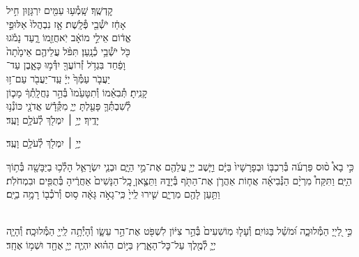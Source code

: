 \documentclass[twoside, openany, parskip=half, 11pt]{book}
\begin{document}
קׇדְשֶֽׁךָ׃ \hfill שָֽׁמְ֯ע֥וּ עַמִּ֖ים יִרְגָּז֑וּן \hfill חִ֣יל \\
אָחַ֔ז יֹשְׁ֯בֵ֖י פְּ֯לָֽשֶׁת׃ \hfill אָ֤ז נִבְהֲלוּ֙ אַלּוּפֵ֣י \\
אֱד֔וֹם \hfill אֵילֵ֣י מוֹאָ֔ב יֹֽאחֲזֵ֖מוֹ רָ֑עַד \hfill נָמֹ֕גוּ \\
כֹּ֖ל יֹשְׁ֯בֵ֥י כְ֯נָֽעַן׃ \hfill תִּפֹּ֨ל עֲלֵיהֶ֤ם אֵימָ֙תָה֙ \\
וָפַ֔חַד \hfill בִּגְדֹ֥ל זְ֯רוֹעֲךָ֖ יִדְּ֯מ֣וּ כָּאָ֑בֶן \hfill עַד־\\
יַעֲבֹ֤ר עַמְּ֯ךָ֙ יְיָ֔ \hfill עַֽד־יַעֲבֹ֖ר עַם־ז֥וּ \\
קָנִֽיתָ׃ \hfill תְּ֯בִאֵ֗מוֹ וְ֯תִטָּעֵ֙מוֹ֙ בְּ֯הַ֣ר נַחֲלָֽתְ֯ךָ֔ \hfill מָכ֧וֹן \\
לְ֯שִׁבְתְּ֯ךָ֛ פָּעַ֖לְתָּ יְיָ֑ \hfill מִקְּ֯דָ֕שׁ אֲדֹנָ֖י כּוֹנְ֯נ֥וּ \\
יָדֶֽיךָ׃ \hfill יְיָ֥ ׀ יִמְלֹ֖ךְ לְ֯עֹלָ֥ם וָעֶֽד׃\hfill \break
\begin{small}
יְיָ֥ ׀ יִמְלֹ֖ךְ לְ֯עֹלָ֥ם וָעֶֽד׃\\
\end{small}
\begin{small}
כִּ֣י בָא֩ ס֨וּס פַּרְעֹ֜ה בְּ֯רִכְבּ֤וֹ וּבְפָרָשָׁיו֙ בַּיָּ֔ם וַיָּ֧שֶׁב יְיָ֛ עֲלֵהֶ֖ם אֶת־מֵ֣י הַיָּ֑ם וּבְנֵ֧י יִשְׂרָאֵ֛ל הָלְ֯כ֥וּ בַיַּבָּשָׁ֖ה בְּ֯ת֥וֹךְ הַיָּֽם׃ וַתִּקַּח֩ מִרְיָ֨ם הַנְּ֯בִיאָ֜ה אֲח֧וֹת אַהֲרֹ֛ן אֶת־הַתֹּ֖ף בְּ֯יָדָ֑הּ וַתֵּצֶ֤אןָ כׇֽל־הַנָּשִׁים֙ אַחֲרֶ֔יהָ בְּ֯תֻפִּ֖ים וּבִמְחֹלֹֽת׃ וַתַּ֥עַן לָהֶ֖ם מִרְיָ֑ם שִׁ֤ירוּ לַֽייָ֙ כִּֽי־גָאֹ֣ה גָּאָ֔ה ס֥וּס וְ֯רֹכְ֯ב֖וֹ רָמָ֥ה בַיָּֽם׃\end{small}
\\
כִּ֣י לַ֭ייָ֭ הַמְּ֯לוּכָ֑ה וּ֝מֹשֵׁ֗ל בַּגּוֹיִֽם׃
וְ֯עָל֤וּ מֽוֹשִׁעִים֙ בְּ֯הַ֣ר צִיּ֔וֹן לִשְׁפֹּ֖ט אֶת־הַ֣ר עֵשָׂ֑ו וְ֯הָיְ֯תָ֥ה לַֽייָ֖ הַמְּ֯לוּכָֽה׃
וְ֯הָיָ֧ה יְיָ֛ לְ֯מֶ֖לֶךְ עַל־כׇּל־הָאָ֑רֶץ בַּיּ֣וֹם הַה֗וּא יִהְיֶ֧ה יְיָ֛ אֶחָ֖ד וּשְׁמ֥וֹ אֶחָֽד׃
\end{document}
